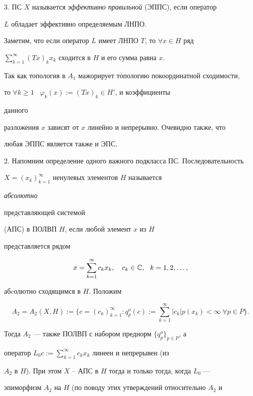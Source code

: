 3. ПС $X$ называется {\it эффективно правильной} (ЭППС), если оператор


$L$ обладает эффективно определяемым ЛНПО.





Заметим, что если оператор $L$ имеет ЛНПО $T$, то $\forall x\in H$ ряд


$\sum\limits_{k=1}^{\infty}(Tx)_kx_k$ сходится в $H$ и его сумма равна $x$.


Так как топология в $A_1$ мажорирует топологию покоординатной сходимости,


то $\forall k\geqslant 1$ \, $\varphi_k(x):=(Tx)_k\in H'$, и коэффициенты


данного


разложения $x$ зависят от $x$ линейно и непрерывно. Очевидно также, что


любая ЭППС является также и ЭПС.


\medskip





2. Напомним определение одного важного подкласса ПС. Последовательность


$X=(x_k)_{k=1}^{\infty}$ ненулевых элементов $H$ называется {\it абсолютно


представляющей системой} (АПС) в ПОЛВП $H$, если любой элемент $x$ из $H$


представляется рядом


\begin{equation}


x=\sum_{k=1}^{\infty}c_kx_k, \quad c_k\in\Bbb{C}, \ \


k=1,2,\dotsc,


\end{equation}


абcолютно сходящимся в $H$. Положим


$$


A_2=A_2(X,H):= \bigg\{c=(c_k)_{k=1}^{\infty}:q_p^o(c):=


\sum_{k=1}^{\infty}|c_k|p(x_k)<\infty \ \forall p\in P \bigg\}.


$$


Тогда $A_2$ --- также ПОЛВП с набором преднорм $ \{q_p^o \}_{p\in P}$, а


оператор $L_0c:=\sum\limits_{k=1}^{\infty}c_kx_k$ линеен и непрерывен (из


$A_2$ в $H$). При этом $X$ -- АПС в $H$ тогда и только тогда, когда $L_0$ ---


эпиморфизм $A_2$ на $H$ (по поводу этих утверждений относительно $A_2$ и


